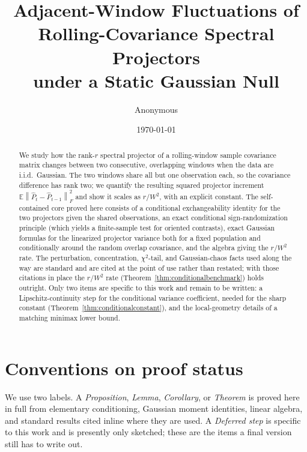 \documentclass[11pt]{article}
\title{Adjacent-Window Fluctuations of\\
Rolling-Covariance Spectral Projectors\\
under a Static Gaussian Null}
\author{Anonymous}
\date{\today}
\theoremstyle{tightplain}
\theoremstyle{tightdef}
\newcommand{\E}{\mathbb E}
\newcommand{\norm}[1]{\left\lVert #1 \right\rVert}
\newcommand{\Phat}{\widehat P}
\begin{document}
\maketitle

\begin{abstract}
We study how the rank-$r$ spectral projector of a rolling-window sample covariance
matrix changes between two consecutive, overlapping windows when the data are
i.i.d.\ Gaussian. The two windows share all but one observation each, so the
covariance difference has rank two; we quantify the resulting squared projector
increment $\E\norm{\Phat_t-\Phat_{t-1}}_F^2$ and show it scales as $r/W^2$, with an
explicit constant. The self-contained core proved here consists of a conditional
exchangeability identity for the two projectors given the shared observations, an
exact conditional sign-randomization principle (which yields a finite-sample test for
oriented contrasts), exact Gaussian formulas for the linearized projector variance
both for a fixed population and conditionally around the random overlap covariance,
and the algebra giving the $r/W^2$ rate. The perturbation, concentration,
$\chi^2$-tail, and Gaussian-chaos facts used along the way are standard and are cited
at the point of use rather than restated; with those citations in place the $r/W^2$
rate (Theorem~\ref{thm:conditionalbenchmark}) holds outright. Only two items are
specific to this work and remain to be written: a Lipschitz-continuity step for the
conditional variance coefficient, needed for the sharp constant
(Theorem~\ref{thm:conditionalconstant}), and the local-geometry details of a matching
minimax lower bound.
\end{abstract}

\section{Conventions on proof status}

We use two labels. A \emph{Proposition}, \emph{Lemma}, \emph{Corollary}, or
\emph{Theorem} is proved here in full from elementary conditioning, Gaussian moment
identities, linear algebra, and standard results cited inline where they are used. A
\emph{Deferred step} is specific to this work and is presently only sketched; these
are the items a final version still has to write out.
\end{document}

